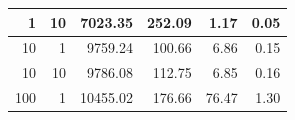 \documentclass[12pt,a4paper]{report}
\begin{document}
\begin{table}[H]
\begin{tabular}{|r|r|r|r|r|r|}
1                                                                                               & 10                                                                                                                      & 7023.35                                                                                                                                    & 252.09                                                                                                                               & 1.17                                                                                                  & 0.05                                                                                                                               \\ \hline
10                                                                                              & 1                                                                                                                       & 9759.24                                                                                                                                    & 100.66                                                                                                                               & 6.86                                                                                                  & 0.15                                                                                                                               \\ \hline
10                                                                                              & 10                                                                                                                      & 9786.08                                                                                                                                    & 112.75                                                                                                                               & 6.85                                                                                                  & 0.16                                                                                                                               \\ \hline
100                                                                                             & 1                                                                                                                       & 10455.02                                                                                                                                   & 176.66                                                                                                                               & 76.47                                                                                                 & 1.30                                                                                                                               \\ \hline

\end{tabular}
\end{table}
\end{document}
